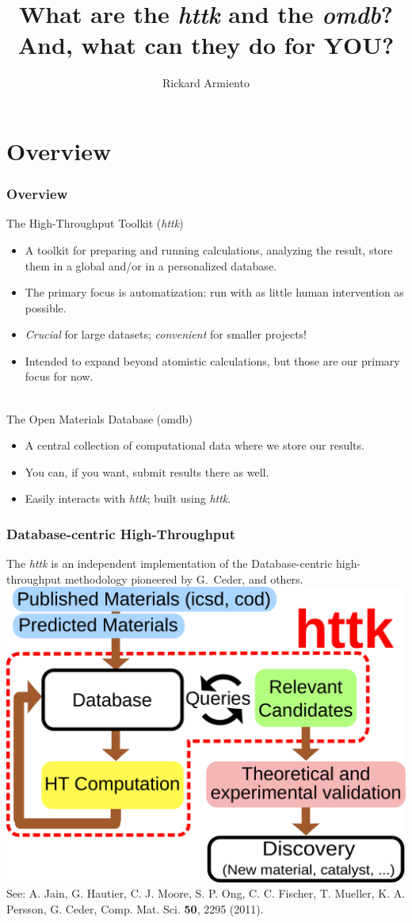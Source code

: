 \documentclass[dvipsnames]{beamer}
\title[httk and omdb]{What are the \emph{httk} and the \emph{omdb}?\\And, what can they do for YOU?}
\author{Rickard Armiento} %
\institute[LiU]{Link{\"o}ping University, Sweden} %
\begin{document}
\begin{frame}
\titlepage 
\end{frame}

\section{Overview}
\begin{frame}
\frametitle{Overview}
{\color{blue} The High-Throughput Toolkit (\emph{httk})}
\begin{itemize}
\item A toolkit for {\color{red}preparing} and {\color{red}running} calculations, {\color{red}analyzing} the result,  {\color{red}store them in a global and/or in a personalized database.}
\item The primary focus is {\color{red} automatization:} run with as little human intervention as possible.
\item \emph{Crucial} for large datasets; \emph{convenient} for smaller projects!
\item Intended to expand beyond atomistic calculations, but those are our primary focus for now.
\end{itemize}\strut\\[0.2cm]

{\color{blue}The Open Materials Database (omdb)}
\begin{itemize}
\item A central collection of computational data where we store our results.
\item You can, if you want, submit results there as well.
\item Easily interacts with \emph{httk}; built using \emph{httk}.
\end{itemize}
\end{frame}

\begin{frame}
\frametitle{Database-centric High-Throughput}
The \emph{httk} is an independent implementation of the Database-centric high-throughput methodology pioneered by G.\ Ceder, and others.\\[0.2cm]
\scriptsize\centering\includegraphics[width=0.6\linewidth]{flowchart_databasedriven_ht.pdf}\\[0.5cm]
See: A. Jain, G. Hautier, C. J. Moore, S. P. Ong, C. C. Fischer, T. Mueller, K. A. Persson, G. Ceder, Comp. Mat. Sci. \textbf{50}, 2295 (2011).
\end{frame}
\end{document}
